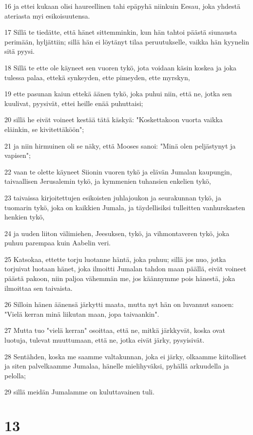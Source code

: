\par 16 ja ettei kukaan olisi haureellinen tahi epäpyhä niinkuin Eesau, joka yhdestä ateriasta myi esikoisuutensa.
\par 17 Sillä te tiedätte, että hänet sittemminkin, kun hän tahtoi päästä siunausta perimään, hyljättiin; sillä hän ei löytänyt tilaa peruutukselle, vaikka hän kyynelin sitä pyysi.
\par 18 Sillä te ette ole käyneet sen vuoren tykö, jota voidaan käsin koskea ja joka tulessa palaa, ettekä synkeyden, ette pimeyden, ette myrskyn,
\par 19 ette pasunan kaiun ettekä äänen tykö, joka puhui niin, että ne, jotka sen kuulivat, pyysivät, ettei heille enää puhuttaisi;
\par 20 sillä he eivät voineet kestää tätä käskyä: "Koskettakoon vuorta vaikka eläinkin, se kivitettäköön";
\par 21 ja niin hirmuinen oli se näky, että Mooses sanoi: "Minä olen peljästynyt ja vapisen";
\par 22 vaan te olette käyneet Siionin vuoren tykö ja elävän Jumalan kaupungin, taivaallisen Jerusalemin tykö, ja kymmenien tuhansien enkelien tykö,
\par 23 taivaissa kirjoitettujen esikoisten juhlajoukon ja seurakunnan tykö, ja tuomarin tykö, joka on kaikkien Jumala, ja täydellisiksi tulleitten vanhurskasten henkien tykö,
\par 24 ja uuden liiton välimiehen, Jeesuksen, tykö, ja vihmontaveren tykö, joka puhuu parempaa kuin Aabelin veri.
\par 25 Katsokaa, ettette torju luotanne häntä, joka puhuu; sillä jos nuo, jotka torjuivat luotaan hänet, joka ilmoitti Jumalan tahdon maan päällä, eivät voineet päästä pakoon, niin paljoa vähemmän me, jos käännymme pois hänestä, joka ilmoittaa sen taivaista.
\par 26 Silloin hänen äänensä järkytti maata, mutta nyt hän on luvannut sanoen: "Vielä kerran minä liikutan maan, jopa taivaankin".
\par 27 Mutta tuo "vielä kerran" osoittaa, että ne, mitkä järkkyvät, koska ovat luotuja, tulevat muuttumaan, että ne, jotka eivät järky, pysyisivät.
\par 28 Sentähden, koska me saamme valtakunnan, joka ei järky, olkaamme kiitolliset ja siten palvelkaamme Jumalaa, hänelle mielihyväksi, pyhällä arkuudella ja pelolla;
\par 29 sillä meidän Jumalamme on kuluttavainen tuli.

\chapter{13}

